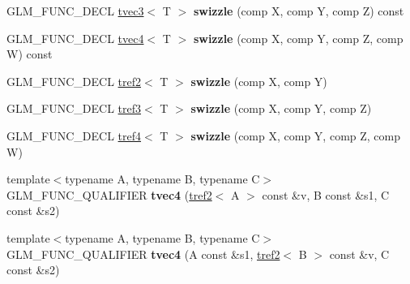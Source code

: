 \begin{DoxyCompactItemize}
\item 
\hypertarget{structglm_1_1detail_1_1tvec4_ad3e7a2acd80f64d62fedef583cd607dd}{G\-L\-M\-\_\-\-F\-U\-N\-C\-\_\-\-D\-E\-C\-L \hyperlink{structglm_1_1detail_1_1tvec3}{tvec3}$<$ T $>$ {\bfseries swizzle} (comp X, comp Y, comp Z) const }\label{structglm_1_1detail_1_1tvec4_ad3e7a2acd80f64d62fedef583cd607dd}

\item 
\hypertarget{structglm_1_1detail_1_1tvec4_a789482aae1e29ca3f5b8fa4deeb0b319}{G\-L\-M\-\_\-\-F\-U\-N\-C\-\_\-\-D\-E\-C\-L \hyperlink{structglm_1_1detail_1_1tvec4}{tvec4}$<$ T $>$ {\bfseries swizzle} (comp X, comp Y, comp Z, comp W) const }\label{structglm_1_1detail_1_1tvec4_a789482aae1e29ca3f5b8fa4deeb0b319}

\item 
\hypertarget{structglm_1_1detail_1_1tvec4_a26ffc9549f4c33f12d74e55da0444f55}{G\-L\-M\-\_\-\-F\-U\-N\-C\-\_\-\-D\-E\-C\-L \hyperlink{structglm_1_1detail_1_1tref2}{tref2}$<$ T $>$ {\bfseries swizzle} (comp X, comp Y)}\label{structglm_1_1detail_1_1tvec4_a26ffc9549f4c33f12d74e55da0444f55}

\item 
\hypertarget{structglm_1_1detail_1_1tvec4_a8e714a52b5fd756328b0fc1c6a3b2b62}{G\-L\-M\-\_\-\-F\-U\-N\-C\-\_\-\-D\-E\-C\-L \hyperlink{structglm_1_1detail_1_1tref3}{tref3}$<$ T $>$ {\bfseries swizzle} (comp X, comp Y, comp Z)}\label{structglm_1_1detail_1_1tvec4_a8e714a52b5fd756328b0fc1c6a3b2b62}

\item 
\hypertarget{structglm_1_1detail_1_1tvec4_aa9301374ce40ac20d6274ba4591e7f4a}{G\-L\-M\-\_\-\-F\-U\-N\-C\-\_\-\-D\-E\-C\-L \hyperlink{structglm_1_1detail_1_1tref4}{tref4}$<$ T $>$ {\bfseries swizzle} (comp X, comp Y, comp Z, comp W)}\label{structglm_1_1detail_1_1tvec4_aa9301374ce40ac20d6274ba4591e7f4a}

\item 
\hypertarget{structglm_1_1detail_1_1tvec4_a4965e30cabe5201ff1f26ce8598b29de}{{\footnotesize template$<$typename A, typename B, typename C$>$ }\\G\-L\-M\-\_\-\-F\-U\-N\-C\-\_\-\-Q\-U\-A\-L\-I\-F\-I\-E\-R {\bfseries tvec4} (\hyperlink{structglm_1_1detail_1_1tref2}{tref2}$<$ A $>$ const \&v, B const \&s1, C const \&s2)}\label{structglm_1_1detail_1_1tvec4_a4965e30cabe5201ff1f26ce8598b29de}

\item 
\hypertarget{structglm_1_1detail_1_1tvec4_a7a668eac64d210f203a857e768e8eccd}{{\footnotesize template$<$typename A, typename B, typename C$>$ }\\G\-L\-M\-\_\-\-F\-U\-N\-C\-\_\-\-Q\-U\-A\-L\-I\-F\-I\-E\-R {\bfseries tvec4} (A const \&s1, \hyperlink{structglm_1_1detail_1_1tref2}{tref2}$<$ B $>$ const \&v, C const \&s2)}\label{structglm_1_1detail_1_1tvec4_a7a668eac64d210f203a857e768e8eccd}


\end{DoxyCompactItemize}
